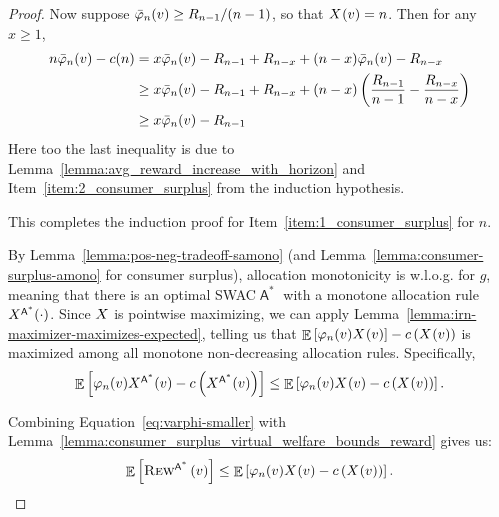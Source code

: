 \documentclass[11pt,letterpaper]{article}
\newcommand{\sqbr}[1]{\left[ #1 \right]}
\newcommand{\brackets}[1]{\left( #1 \right)}
\newcommand{\swac}{SWAC\xspace}
\DeclareMathOperator*{\E}{\bb{E}}
\newcommand{\bb}[1]{\mathbb{#1}}
\DeclareMathOperator{\A}{\auc{A}}
\newcommand{\g}{g}
\newcommand{\irn}{\Bar{\varphi}}
\theoremstyle{plain}
\newcommand{\auc}[1]{\mathsf{#1}}
\begin{document}
\begin{proof}
        
        Now suppose $\irn_n(v)\geq R_{n-1}/(n-1)$, so that $\x{v}=n$. Then for any $x\geq 1$,
        \begin{align*}
            n\irn_n(v)-c(n)&=x\irn_n(v)-R_{n-1}+R_{n-x}+(n-x)\irn_n(v)-R_{n-x}\\
            &\geq x\irn_n(v)-R_{n-1}+R_{n-x}+(n-x)\brackets{\frac{R_{n-1}}{n-1}-\frac{R_{n-x}}{n-x}}\\
            &\geq x\irn_n(v)-R_{n-1}
        \end{align*}
        Here too the last inequality is due to Lemma~\ref{lemma:avg_reward_increase_with_horizon} and Item~\ref{item:2_consumer_surplus} from the induction hypothesis.

This completes the induction proof for Item~\ref{item:1_consumer_surplus} for $n$. 

By Lemma~\ref{lemma:pos-neg-tradeoff-samono} (and Lemma~\ref{lemma:consumer-surplus-amono} for consumer surplus), allocation monotonicity is w.l.o.g. for $\g$, meaning that there is an optimal \swac $\A^\ast$ with a monotone allocation rule $\x[\A^\ast]{\cdot}$.
Since $\alloc$ is pointwise maximizing, we can apply Lemma~\ref{lemma:irn-maximizer-maximizes-expected}, telling us that $\E\sqbr{\varphi_{n}(v)\x{v}}-c\brackets{\x{v}}$ is maximized among all monotone non-decreasing allocation rules. Specifically,
\begin{align}\label{eq:varphi-smaller}
    \E\sqbr{\varphi_{n}(v)\x[\A^\ast]{v}-c\brackets{\x[\A^\ast]{v}}}\leq\E\sqbr{\varphi_{n}(v)\x{v}-c\brackets{\x{v}}}.
\end{align}

Combining Equation~\ref{eq:varphi-smaller} with Lemma~\ref{lemma:consumer_surplus_virtual_welfare_bounds_reward} gives us:
\begin{align}\label{eq:opt-bound}
    \E\sqbr{\trew[\A^\ast]{v}}\leq\E\sqbr{\varphi_{n}(v)\x{v}-c\brackets{\x{v}}}.
\end{align}


\end{proof}
\end{document}
